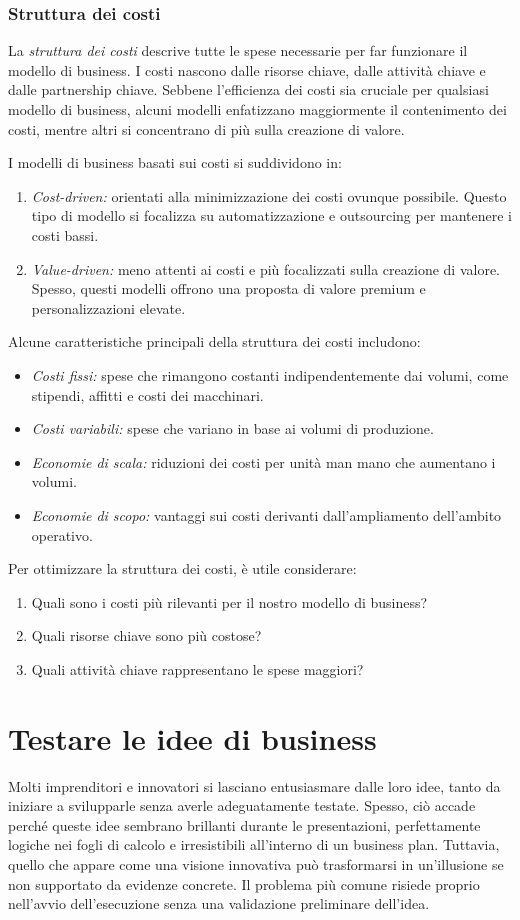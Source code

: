 \subsection*{Struttura dei costi}
La \textit{struttura dei costi} descrive tutte le spese necessarie per far funzionare il modello di business. I costi nascono dalle risorse chiave, dalle attività chiave e dalle partnership chiave. Sebbene l’efficienza dei costi sia cruciale per qualsiasi modello di business, alcuni modelli enfatizzano maggiormente il contenimento dei costi, mentre altri si concentrano di più sulla creazione di valore.

I modelli di business basati sui costi si suddividono in:
\begin{enumerate}
    \item \textit{Cost-driven:} orientati alla minimizzazione dei costi ovunque possibile. Questo tipo di modello si focalizza su automatizzazione e outsourcing per mantenere i costi bassi.
    \item \textit{Value-driven:} meno attenti ai costi e più focalizzati sulla creazione di valore. Spesso, questi modelli offrono una proposta di valore premium e personalizzazioni elevate.
\end{enumerate}
Alcune caratteristiche principali della struttura dei costi includono:
\begin{itemize}
    \item \textit{Costi fissi:} spese che rimangono costanti indipendentemente dai volumi, come stipendi, affitti e costi dei macchinari.
    \item \textit{Costi variabili:} spese che variano in base ai volumi di produzione.
    \item \textit{Economie di scala:} riduzioni dei costi per unità man mano che aumentano i volumi.
    \item \textit{Economie di scopo:} vantaggi sui costi derivanti dall’ampliamento dell’ambito operativo.
\end{itemize}
Per ottimizzare la struttura dei costi, è utile considerare:
\begin{enumerate}
    \item Quali sono i costi più rilevanti per il nostro modello di business?
    \item Quali risorse chiave sono più costose?
    \item Quali attività chiave rappresentano le spese maggiori?
\end{enumerate}

\chapter{Testare le idee di business}
Molti imprenditori e innovatori si lasciano entusiasmare dalle loro idee, tanto da iniziare a svilupparle senza averle adeguatamente testate. Spesso, ciò accade perché queste idee sembrano brillanti durante le presentazioni, perfettamente logiche nei fogli di calcolo e irresistibili all'interno di un business plan. Tuttavia, quello che appare come una visione innovativa può trasformarsi in un’illusione se non supportato da evidenze concrete. Il problema più comune risiede proprio nell’avvio dell’esecuzione senza una validazione preliminare dell’idea.

